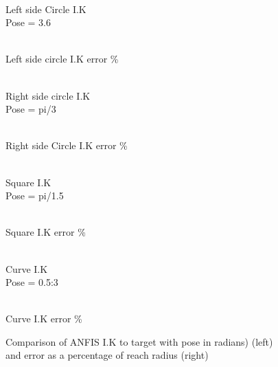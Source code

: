 \documentclass[a4paper,11pt]{article}
\begin{document}
\begin{figure}[H]

\begin{minipage}{.5\linewidth}
\centering
{}\\{Left side Circle I.K }\\{Pose = 3.6}
\end{minipage}
\begin{minipage}{.5\linewidth}
\centering
{}\\{Left side circle I.K error \%}

\end{minipage}\par\medskip

\begin{minipage}{.5\linewidth}
\centering
{}\\{Right side circle I.K}\\{Pose = pi/3}
\end{minipage}
\begin{minipage}{.5\linewidth}
\centering
{}\\{Right side Circle I.K error \%}

\end{minipage}\par\medskip

\begin{minipage}{.5\linewidth}
\centering
{}\\{Square I.K}\\{Pose = pi/1.5}

\end{minipage}
\begin{minipage}{.5\linewidth}
\centering
{}\\{Square I.K error \%}

\end{minipage}\par\medskip

\begin{minipage}{.5\linewidth}
\centering
{}\\{Curve I.K}\\{Pose = 0.5:3}

\end{minipage}
\begin{minipage}{.5\linewidth}
\centering
{}\\{Curve I.K error \%}

\end{minipage}

\caption{Comparison of ANFIS I.K to target with pose in radians) (left)\\ and error as a percentage of reach radius (right)}
\label{fig:ANFIS}
\end{figure}
\end{document}
